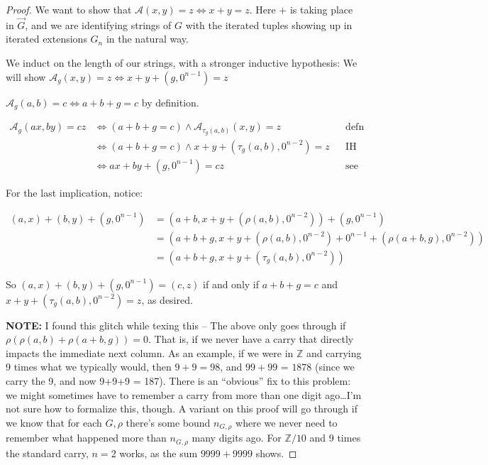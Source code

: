 \documentclass[12pt]{article}
\theoremstyle{definition}
\newcommand{\Z}{\mathbb{Z}}
\begin{document}
  \begin{proof}
    We want to show that $\mathcal{A}(x,y) = z \iff x+y=z$. 
    Here $+$ is taking place in $\overrightarrow{G}$, and we are identifying
    strings of $G$ with the iterated tuples showing up in iterated extensions
    $G_n$ in the natural way.

    We induct on the length of our strings, with a stronger inductive hypothesis:
    We will show $\mathcal{A}_g(x,y) = z \iff x+y+(g,0^{n-1}) = z$

    \bigskip

    $\mathcal{A}_g(a,b) = c \iff a + b + g = c$ by definition.

    \begin{align*}
      \mathcal{A}_g(ax,by) = cz 
      &\iff (a+b+g=c) \land \mathcal{A}_{\tau_g(a,b)}(x,y) = z && \text{defn}\\
      &\iff (a+b+g=c) \land x+y+(\tau_g(a,b),0^{n-2}) = z      && \text{IH}\\
      &\iff ax + by + (g,0^{n-1}) = cz                         && \text{see below}
    \end{align*}

    For the last implication, notice:

    \begin{align*}
      (a,x) + (b,y) + (g,0^{n-1}) 
      &= (a+b, x+y+(\rho(a,b),0^{n-2})) + (g,0^{n-1})\\
      &= (a+b+g, x+y+(\rho(a,b),0^{n-2}) + 0^{n-1} + (\rho(a+b,g),0^{n-2}))\\ 
      &= (a+b+g, x+y+(\tau_g(a,b), 0^{n-2}))
    \end{align*}

    So $(a,x) + (b,y) + (g,0^{n-1}) = (c,z)$ if and only if 
    $a+b+g=c$ and $x+y+(\tau_g(a,b),0^{n-2}) = z$, as desired.

    \textbf{NOTE:} I found this glitch while texing this -- The above only 
    goes through if $\rho(\rho(a,b) + \rho(a+b,g)) = 0$. That is, if we never
    have a carry that directly impacts the immediate next column. As an 
    example, if we were in $\Z$ and carrying 9 times what we typically would,
    then $9 + 9 = 98$, and $99 + 99$ = $1878$ 
    (since we carry the 9, and now 9+9+9 = 187).
    There is an ``obvious'' fix to this problem: we might sometimes have to
    remember a carry from more than one digit ago\ldots I'm not sure how to
    formalize this, though. A variant on this proof will go through if we 
    know that for each $G, \rho$ there's some bound $n_{G,\rho}$ 
    where we never need to remember what happened more than $n_{G,\rho}$ 
    many digits ago. For $\Z / 10$ and 9 times the standard carry, $n=2$
    works, as the sum $9999 + 9999$ shows.
  \end{proof}
\end{document}
